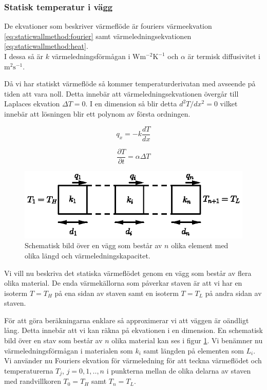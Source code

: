 \subsubsection{Statisk temperatur i vägg}


De ekvationer som beskriver värmeflöde är fouriers värmeekvation
\eqref{eq:staticwallmethod:fourier} samt värmeledningsekvationen
\eqref{eq:staticwallmethod:heat}. \\I dessa så är
$k$ värmeledningsförmågan i $\mbox{W}\mbox{m}^{-2}\mbox{K}^{-1}$ och
$\alpha$ är termisk diffusivitet i $\mbox{m}^2\mbox{s}^{-1}$. \cite{physicshandbook}

Då vi har statiskt värmeflöde
så kommer temperaturderivatan med avseende på tiden att vara noll.
Detta innebär att värmeledningsekvationen övergår till Laplaces ekvation
$\Delta{}T = 0$. I en dimension så blir detta $d^2T/dx^2 = 0$ vilket innebär
att lösningen blir ett polynom av första ordningen.  

\begin{equation}
\label{eq:staticwallmethod:fourier}
q_x = -k\frac{dT}{dx}
\end{equation}

\begin{equation}
\label{eq:staticwallmethod:heat}
\frac{\partial{}T}{\partial{}t} = \alpha\Delta{}T
\end{equation}

\begin{figure}
\centering
\includegraphics{images/wall.eps}
\caption{Schematisk bild över en vägg som består av $n$ olika element med olika
längd och värmeledningskapacitet.}\label{fig:staticwallmethod:wall}
\end{figure}

\noindent
Vi vill nu beskriva det statiska värmeflödet genom en vägg som består
av flera olika material. De enda värmekällorna som påverkar staven
är att vi har en isoterm $T = T_H$ på ena sidan av staven
samt en isoterm $T = T_L$ på andra sidan av staven.

För att göra beräkningarna enklare så
approximerar vi att väggen är oändligt lång. Detta innebär att vi kan räkna
på ekvationen i en dimension. En schematisk bild över en stav som består av
$n$ olika material kan ses i figur \ref{fig:staticwallmethod:wall}.
Vi benämner nu värmeledningsförmågan i materialen som $k_i$ samt längden
på elementen som $L_i$. Vi använder nu Fouriers ekvation för värmeledning för
att teckna värmeflödet och temperaturerna $T_j$, $j=0,1,..,n$ i punkterna
mellan de olika delarna av staven med randvillkoren $T_0 = T_H$ samt
$T_n = T_L$.

